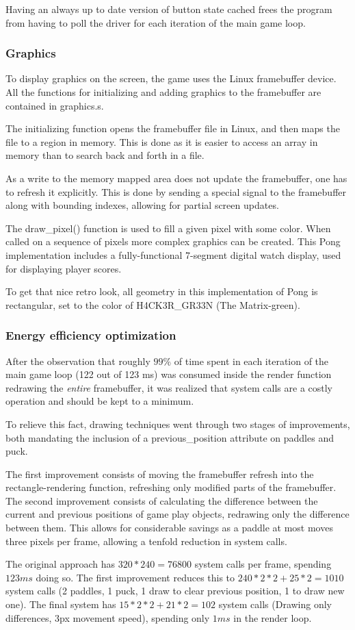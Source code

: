 Having an always up to date version of button state cached frees the program
from having to poll the driver for each iteration of the main game loop.

\subsubsection{Graphics}
To display graphics on the screen, the game uses the Linux framebuffer device.
All the functions for initializing and adding graphics to the framebuffer are
contained in graphics.s.

The initializing function opens the framebuffer file in Linux, and then maps the
file to a region in memory. This is done as it is easier to access an array in memory
than to search back and forth in a file.

As a write to the memory mapped area does not update the framebuffer,
one has to refresh it explicitly.
This is done by sending a special signal to the framebuffer
along with bounding indexes, allowing for partial screen updates.

The draw\_pixel() function is used to fill a given pixel with some color.
When called on a sequence of pixels more complex graphics can be created.
This Pong implementation includes a fully-functional 7-segment digital watch display,
used for displaying player scores.

To get that nice retro look, all geometry in this implementation of Pong is rectangular,
set to the color of H4CK3R\_GR33N (The Matrix-green).

\subsubsection{Energy efficiency optimization}
After the observation that roughly $ 99 \% $ of time spent in each iteration of the
main game loop (122 out of 123 ms) was consumed inside the render function redrawing
the \emph{entire} framebuffer,
it was realized that system calls are a costly operation and should be kept to a minimum.

To relieve this fact, drawing techniques went through two stages of improvements,
both mandating the inclusion of a previous\_position attribute on paddles and puck.

The first improvement consists of moving the framebuffer refresh into the
rectangle-rendering function, refreshing only modified parts of the framebuffer.
The second improvement consists of calculating the difference between the current
and previous positions of game play objects, redrawing only the difference between them.
This allows for considerable savings as a paddle at most moves three pixels per frame,
allowing a tenfold reduction in system calls.

The original approach has $ 320 * 240 = 76800 $
system calls per frame, spending $ 123 ms $ doing so.
The first improvement reduces this to $ 240 * 2 * 2+ 25 * 2 = 1010 $ system calls
(2 paddles, 1 puck, 1 draw to clear previous position, 1 to draw new one).
The final system has $ 15 * 2 * 2 + 21 * 2 = 102 $ system calls
(Drawing only differences, 3px movement speed), spending only $ 1 ms $ in the render loop.
